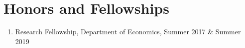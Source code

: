 \documentclass[12pt,letterpaper]{article}
\begin{document}
\section*{Honors and Fellowships}
\begin{enumerate}
  \item Research Fellowship, Department of Economics, Summer 2017 \& Summer 2019
\end{enumerate}
%	
%	
%	
%
%
%		
\end{document}

